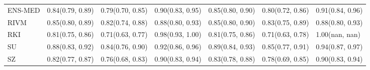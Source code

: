 \begin{tabular}{l p{} p{} p{} p{} p{} p{}}
ENS-MED & {0.84\newline(0.79, 0.89)} & {0.79\newline(0.70, 0.85)} & {0.90\newline(0.83, 0.95)} & {0.85\newline(0.80, 0.90)} & {0.80\newline(0.72, 0.86)} & {0.91\newline(0.84, 0.96)} \\
RIVM & {0.85\newline(0.80, 0.89)} & {0.82\newline(0.74, 0.88)} & {0.88\newline(0.80, 0.93)} & {0.85\newline(0.80, 0.90)} & {0.83\newline(0.75, 0.89)} & {0.88\newline(0.80, 0.93)} \\
RKI & {0.81\newline(0.75, 0.86)} & {0.71\newline(0.63, 0.77)} & {0.98\newline(0.93, 1.00)} & {0.81\newline(0.75, 0.86)} & {0.71\newline(0.63, 0.78)} & {1.00\newline(nan, nan)} \\
SU & {0.88\newline(0.83, 0.92)} & {0.84\newline(0.76, 0.90)} & {0.92\newline(0.86, 0.96)} & {0.89\newline(0.84, 0.93)} & {0.85\newline(0.77, 0.91)} & {0.94\newline(0.87, 0.97)} \\
SZ & {0.82\newline(0.77, 0.87)} & {0.76\newline(0.68, 0.83)} & {0.90\newline(0.83, 0.94)} & {0.83\newline(0.78, 0.88)} & {0.78\newline(0.69, 0.85)} & {0.90\newline(0.83, 0.94)} \\
\bottomrule
\end{tabular}
